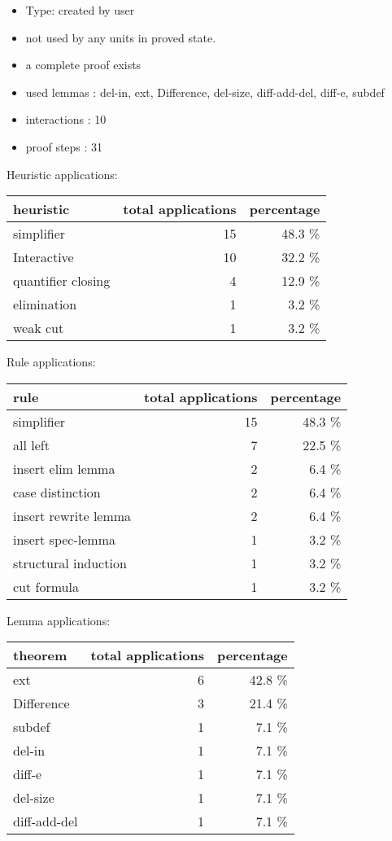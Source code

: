 \documentclass[a4paper]{article}
\begin{document}
\begin{itemize}

\item Type: created by user

\item not used by any units in proved state.
\item       a complete proof exists
\item       used lemmas  : del-in, ext, Difference, del-size, diff-add-del, diff-e, subdef
\item       interactions : 10
\item       proof steps  : 31
\end{itemize}

\medskip


Heuristic applications:

\begin{supertabular}{l|r|r}
heuristic	& total applications & percentage \\ \hline
simplifier & 15 & 48.3 \% \\
Interactive & 10 & 32.2 \% \\
quantifier closing & 4 & 12.9 \% \\
elimination & 1 & 3.2 \% \\
weak cut & 1 & 3.2 \% \\

\end{supertabular}

Rule applications:

\begin{supertabular}{l|r|r}
rule	        & total applications & percentage \\ \hline
simplifier & 15 & 48.3 \% \\
all left & 7 & 22.5 \% \\
insert elim lemma & 2 & 6.4 \% \\
case distinction & 2 & 6.4 \% \\
insert rewrite lemma & 2 & 6.4 \% \\
insert spec-lemma & 1 & 3.2 \% \\
structural induction & 1 & 3.2 \% \\
cut formula & 1 & 3.2 \% \\

\end{supertabular}

Lemma applications:

\begin{supertabular}{l|r|r}
theorem	        & total applications & percentage \\ \hline
ext & 6 & 42.8 \% \\
Difference & 3 & 21.4 \% \\
subdef & 1 & 7.1 \% \\
del-in & 1 & 7.1 \% \\
diff-e & 1 & 7.1 \% \\
del-size & 1 & 7.1 \% \\
diff-add-del & 1 & 7.1 \% \\

\end{supertabular}
\pagebreak
\end{document}
